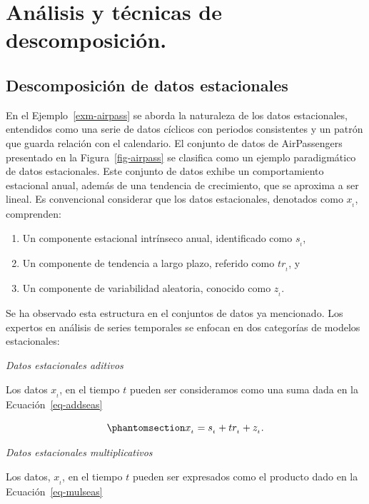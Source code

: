 \documentclass[
  us-letterpaper,
]{scrreprt}
\theoremstyle{plain}
\theoremstyle{definition}
\theoremstyle{plain}
\theoremstyle{definition}
\theoremstyle{remark}
\begin{document}
\section{Análisis y técnicas de
descomposición.}\label{anuxe1lisis-y-tuxe9cnicas-de-descomposiciuxf3n.}

\subsection{Descomposición de datos
estacionales}\label{descomposiciuxf3n-de-datos-estacionales}

En el Ejemplo~\ref{exm-airpass} se aborda la naturaleza de los datos
estacionales, entendidos como una serie de datos cíclicos con periodos
consistentes y un patrón que guarda relación con el calendario. El
conjunto de datos de AirPassengers presentado en la
Figura~\ref{fig-airpass} se clasifica como un ejemplo paradigmático de
datos estacionales. Este conjunto de datos exhibe un comportamiento
estacional anual, además de una tendencia de crecimiento, que se
aproxima a ser lineal. Es convencional considerar que los datos
estacionales, denotados como \(x_{_t}\), comprenden:

\begin{enumerate}
\def\labelenumi{\alph{enumi}.}
\item
  Un componente estacional intrínseco anual, identificado como
  \(s_{_t}\),
\item
  Un componente de tendencia a largo plazo, referido como \(tr_{_t}\), y
\item
  Un componente de variabilidad aleatoria, conocido como \(z_{_t}\).
\end{enumerate}

Se ha observado esta estructura en el conjuntos de datos ya mencionado.
Los expertos en análisis de series temporales se enfocan en dos
categorías de modelos estacionales:

\emph{Datos estacionales aditivos}

Los datos \(x_{_t}\), en el tiempo \(t\) pueden ser consideramos como
una suma dada en la Ecuación~\ref{eq-addseas}

\begin{equation}\phantomsection\label{eq-addseas}{
x_{_t}=s_{_t}+tr_{_t}+z_{_t}.
}\end{equation}

\emph{Datos estacionales multiplicativos}

Los datos, \(x_{_t}\), en el tiempo \(t\) pueden ser expresados como el
producto dado en la Ecuación~\ref{eq-mulseas}
\end{document}
